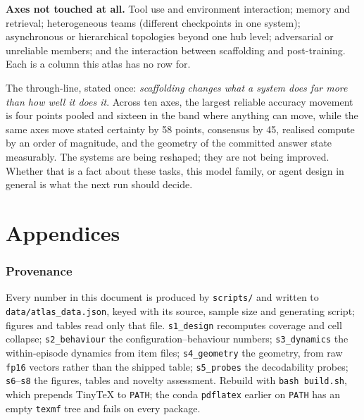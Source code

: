 \documentclass[10pt,a4paper]{article}
\begin{document}
\textbf{Axes not touched at all.} Tool use and environment interaction; memory and retrieval; heterogeneous teams (different checkpoints in one system); asynchronous or hierarchical topologies beyond one hub level; adversarial or unreliable members; and the interaction between scaffolding and post-training. Each is a column this atlas has no row for.

\bigskip\noindent
The through-line, stated once: \emph{scaffolding changes what a system does far more than how well it does it}. Across ten axes, the largest reliable accuracy movement is four points pooled and sixteen in the band where anything can move, while the same axes move stated certainty by 58 points, consensus by 45, realised compute by an order of magnitude, and the geometry of the committed answer state measurably. The systems are being reshaped; they are not being improved. Whether that is a fact about these tasks, this model family, or agent design in general is what the next run should decide.

\appendix
\part*{Appendices}

\section{Provenance}\label{app:prov}
Every number in this document is produced by \texttt{scripts/} and written to \texttt{data/atlas\_data.json}, keyed with its source, sample size and generating script; figures and tables read only that file. \texttt{s1\_design} recomputes coverage and cell collapse; \texttt{s2\_behaviour} the configuration--behaviour numbers; \texttt{s3\_dynamics} the within-episode dynamics from item files; \texttt{s4\_geometry} the geometry, from raw \texttt{fp16} vectors rather than the shipped table; \texttt{s5\_probes} the decodability probes; \texttt{s6}--\texttt{s8} the figures, tables and novelty assessment. Rebuild with \texttt{bash build.sh}, which prepends TinyTeX to \texttt{PATH}; the conda \texttt{pdflatex} earlier on \texttt{PATH} has an empty \texttt{texmf} tree and fails on every package.
\end{document}
